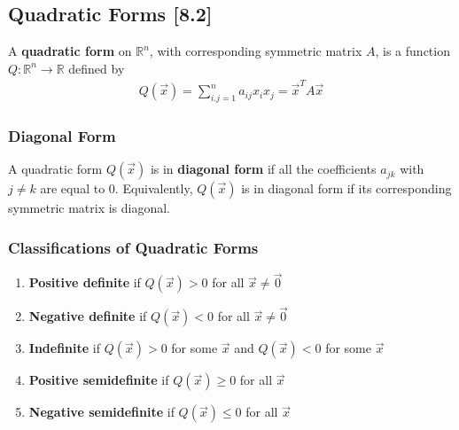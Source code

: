 \documentclass[a4paper,9pt]{extarticle}
\begin{document}
\begin{multicols*}{2}

\subsection{Quadratic Forms [8.2]}
A \textbf{quadratic form} on $\mathbb{R}^n$, with corresponding symmetric matrix $A$, is a function $Q : \mathbb{R}^n \to \mathbb{R}$ defined by
\begin{equation} \label{8.2-1}
    \begin{split}
        Q(\vec{x}) = \sum_{i.j = 1}^{n} a_{ij} x_i x_j = \vec{x}^T A \vec{x}
    \end{split}
\end{equation}


\subsubsection{Diagonal Form}
A quadratic form $Q(\vec{x})$ is in \textbf{diagonal form} if all the coefficients $a_{jk}$ with $j \neq k$ are equal to $0$. Equivalently, $Q(\vec{x})$ is in diagonal form if its corresponding symmetric matrix is diagonal.


\subsubsection{Classifications of Quadratic Forms}
\begin{enumerate}[label=\bfseries \arabic*.] \itemsep0pt \parskip0pt
    \item \textbf{Positive definite} if $Q(\vec{x}) > 0$ for all $\vec{x} \neq \vec{0}$
    \item \textbf{Negative definite} if $Q(\vec{x}) < 0$ for all $\vec{x} \neq \vec{0}$
    \item \textbf{Indefinite} if $Q(\vec{x}) > 0$ for some $\vec{x}$ and $Q(\vec{x}) < 0$ for some $\vec{x}$
    \item \textbf{Positive semidefinite} if $Q(\vec{x}) \geq 0$ for all $\vec{x}$
    \item \textbf{Negative semidefinite} if $Q(\vec{x}) \leq 0$ for all $\vec{x}$
\end{enumerate}



\end{multicols*}
\end{document}
